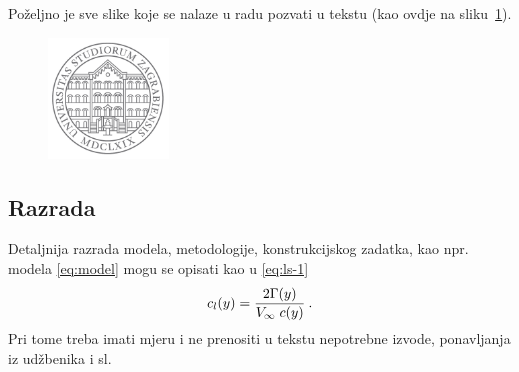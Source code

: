 Poželjno je sve slike koje se nalaze u radu pozvati u tekstu (kao ovdje na
sliku~\ref{fig:unizg}).
\begin{figure}
  \centering
  \includegraphics[height=3.2cm]{unizg_sivi_t4s}\\
  \label{fig:unizg}
\end{figure}
%

\subsection{Razrada}
Detaljnija razrada modela, metodologije, konstrukcijskog zadatka, kao npr.
modela \eqref{eq:model} mogu se opisati kao u
\eqref{eq:ls-1}
\begin{equation}\label{eq:ls-1}
	c_l(y)=\frac{2\Gamma(y)}{\hbox{$V_{\infty}$}\;c(y)}\:.
\end{equation}
%
Pri tome treba imati mjeru i ne prenositi u tekstu nepotrebne izvode,
ponavljanja iz udžbenika i sl.
